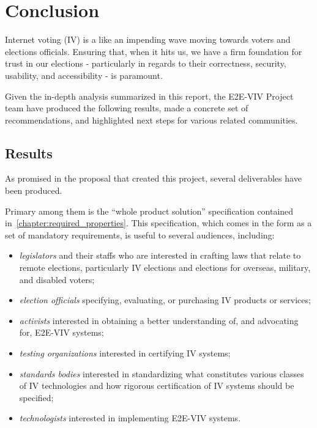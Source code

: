 \chapter{Conclusion}
\label{chapter:conclusion}

Internet voting (IV) is a like an impending wave moving towards voters and elections
officials.  Ensuring that, when it hits us, we have a firm foundation
for trust in our elections - particularly in regards to their
correctness, security, usability, and accessibility - is paramount.

Given the in-depth analysis summarized in this report, the E2E-VIV
Project team have produced the following
results, made a concrete set of recommendations, and highlighted next
steps for various related communities.

\section{Results}

As promised in the proposal that created this project,
several deliverables have been produced.  

Primary among them is the ``whole product solution'' specification
contained in~\autoref{chapter:required_properties}. This
specification, which comes in the form as a set of mandatory
requirements, is useful to several audiences, including:
\begin{itemize}
\item \emph{legislators} and their staffs who are interested in
  crafting laws that relate to remote elections, particularly IV
  elections and elections for overseas, military, and disabled voters;
\item \emph{election officials} specifying, evaluating, or purchasing
  IV products or services;
\item \emph{activists} interested in obtaining a better understanding
  of, and advocating for, E2E-VIV systems;
\item \emph{testing organizations} interested in certifying IV
  systems;
\item \emph{standards bodies} interested in standardizing what
  constitutes various classes of IV technologies and how rigorous
  certification of IV systems should be specified;
\item \emph{technologists} interested in implementing E2E-VIV systems.
\end{itemize}


